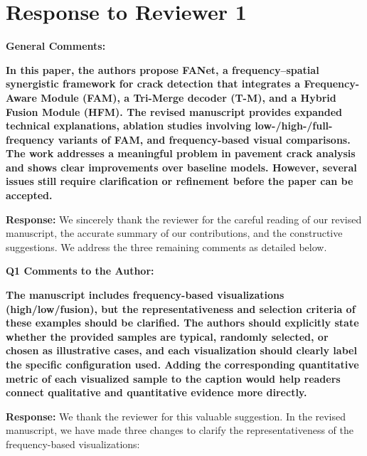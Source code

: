 \documentclass[letterpaper,journal,onecolumn,12pt]{IEEEtran}
\begin{document}
\clearpage

\section{Response to Reviewer 1}

{\color{BlueGreen} \textbf{General Comments:}

\textbf{In this paper, the authors propose FANet, a frequency–spatial synergistic framework for crack detection that
integrates a Frequency-Aware Module (FAM), a Tri-Merge decoder (T-M), and a Hybrid Fusion Module (HFM). The revised
manuscript provides expanded technical explanations, ablation studies involving low-/high-/full-frequency variants of
FAM, and frequency-based visual comparisons. The work addresses a meaningful problem in pavement crack analysis and
shows clear improvements over baseline models. However, several issues still require clarification or refinement
before the paper can be accepted.}}

\textbf{Response:}
We sincerely thank the reviewer for the careful reading of our revised manuscript, the accurate summary of our
contributions, and the constructive suggestions. We address the three remaining comments as detailed below.\\[10pt]

{\color{BlueGreen} \textbf{Q1 Comments to the Author:}

\textbf{The manuscript includes frequency-based visualizations (high/low/fusion), but the representativeness and
selection criteria of these examples should be clarified. The authors should explicitly state whether the provided
samples are typical, randomly selected, or chosen as illustrative cases, and each visualization should clearly label
the specific configuration used. Adding the corresponding quantitative metric of each visualized sample to the
caption would help readers connect qualitative and quantitative evidence more directly.}}

\textbf{Response:}
We thank the reviewer for this valuable suggestion. In the revised manuscript, we have made three changes to clarify
the representativeness of the frequency-based visualizations:
\end{document}
